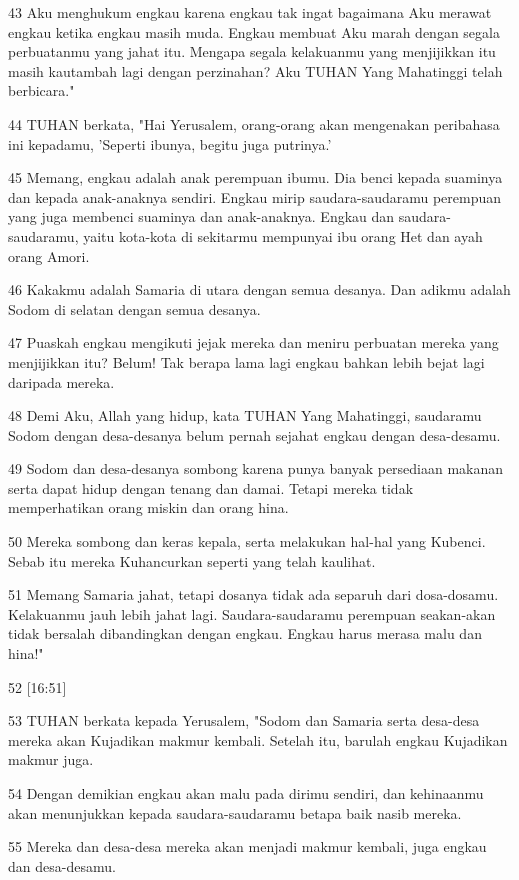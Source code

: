 \par 43 Aku menghukum engkau karena engkau tak ingat bagaimana Aku merawat engkau ketika engkau masih muda. Engkau membuat Aku marah dengan segala perbuatanmu yang jahat itu. Mengapa segala kelakuanmu yang menjijikkan itu masih kautambah lagi dengan perzinahan? Aku TUHAN Yang Mahatinggi telah berbicara."
\par 44 TUHAN berkata, "Hai Yerusalem, orang-orang akan mengenakan peribahasa ini kepadamu, 'Seperti ibunya, begitu juga putrinya.'
\par 45 Memang, engkau adalah anak perempuan ibumu. Dia benci kepada suaminya dan kepada anak-anaknya sendiri. Engkau mirip saudara-saudaramu perempuan yang juga membenci suaminya dan anak-anaknya. Engkau dan saudara-saudaramu, yaitu kota-kota di sekitarmu mempunyai ibu orang Het dan ayah orang Amori.
\par 46 Kakakmu adalah Samaria di utara dengan semua desanya. Dan adikmu adalah Sodom di selatan dengan semua desanya.
\par 47 Puaskah engkau mengikuti jejak mereka dan meniru perbuatan mereka yang menjijikkan itu? Belum! Tak berapa lama lagi engkau bahkan lebih bejat lagi daripada mereka.
\par 48 Demi Aku, Allah yang hidup, kata TUHAN Yang Mahatinggi, saudaramu Sodom dengan desa-desanya belum pernah sejahat engkau dengan desa-desamu.
\par 49 Sodom dan desa-desanya sombong karena punya banyak persediaan makanan serta dapat hidup dengan tenang dan damai. Tetapi mereka tidak memperhatikan orang miskin dan orang hina.
\par 50 Mereka sombong dan keras kepala, serta melakukan hal-hal yang Kubenci. Sebab itu mereka Kuhancurkan seperti yang telah kaulihat.
\par 51 Memang Samaria jahat, tetapi dosanya tidak ada separuh dari dosa-dosamu. Kelakuanmu jauh lebih jahat lagi. Saudara-saudaramu perempuan seakan-akan tidak bersalah dibandingkan dengan engkau. Engkau harus merasa malu dan hina!"
\par 52 [16:51]
\par 53 TUHAN berkata kepada Yerusalem, "Sodom dan Samaria serta desa-desa mereka akan Kujadikan makmur kembali. Setelah itu, barulah engkau Kujadikan makmur juga.
\par 54 Dengan demikian engkau akan malu pada dirimu sendiri, dan kehinaanmu akan menunjukkan kepada saudara-saudaramu betapa baik nasib mereka.
\par 55 Mereka dan desa-desa mereka akan menjadi makmur kembali, juga engkau dan desa-desamu.
